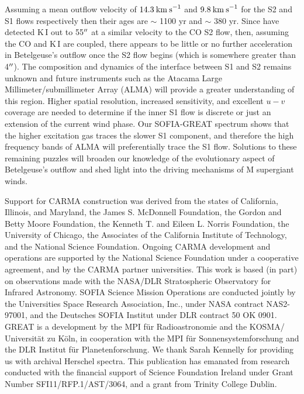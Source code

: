 \documentclass[iop]{emulateapj}
\begin{document}
Assuming a mean outflow velocity of $14.3\>{\rm km\>s}^{-1}$ and $9.8\>{\rm km\>s}^{-1}$ for the S2 and S1 flows respectively then their ages are $\sim$ 1100 yr and $\sim$ 380 yr. Since \cite{2002A&A...386.1009P} have detected K\,I out to 55$\mbox{$^{\prime\prime}$}$ at a similar velocity to the CO S2 flow, then, assuming the CO and K\,I are coupled, there appears to be little or no further acceleration in Betelgeuse's outflow once the S2 flow begins (which is somewhere greater than 4$\mbox{$^{\prime\prime}$}$). The composition and dynamics of the interface between S1 and S2 remains unknown and future instruments such as the Atacama Large Millimeter/submillimeter Array (ALMA) will provide a greater understanding of this region. Higher spatial resolution, increased sensitivity, and excellent $u-v$ coverage are needed to determine if the inner S1 flow is discrete or just an extension of the current wind phase. Our SOFIA-GREAT spectrum shows that the higher excitation gas traces the slower S1 component, and therefore the high frequency bands of ALMA will preferentially trace the S1 flow. Solutions to these remaining puzzles will broaden our knowledge of the evolutionary aspect of Betelgeuse's outflow and shed light into the driving mechanisms of M supergiant winds.

\acknowledgments

Support for CARMA construction was derived from the states of California, Illinois, and
Maryland, the James S. McDonnell Foundation, the Gordon and Betty Moore Foundation, the
Kenneth T. and Eileen L. Norris Foundation, the University of Chicago, the Associates of the
California Institute of Technology, and the National Science Foundation. Ongoing CARMA
development and operations are supported by the National Science Foundation under a
cooperative agreement, and by the CARMA partner universities. This work is based (in part) on observations made with the NASA/DLR Stratospheric Observatory for Infrared Astronomy. SOFIA Science Mission Operations are conducted jointly by the Universities Space Research Association, Inc., under NASA contract NAS2-97001, and the Deutsches SOFIA Institut under DLR contract 50 OK 0901. GREAT is a development by the MPI f\"ur Radioastronomie and the KOSMA/ Universit\"at zu K\"oln, in cooperation with the MPI f\"ur Sonnensystemforschung and the DLR Institut f\"ur Planetenforschung. We thank Sarah Kennelly for providing us with archival Herschel spectra. This publication has emanated from research conducted with the financial support of Science Foundation Ireland under Grant Number SFI11/RFP.1/AST/3064, and a grant from Trinity College Dublin.
\end{document}
